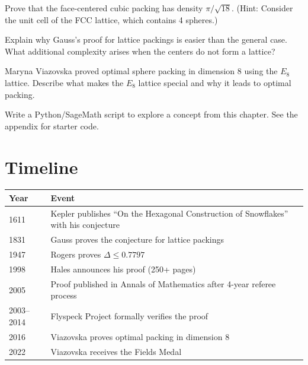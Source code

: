 \begin{exercise}[Intermediate]
Prove that the face-centered cubic packing has density $\pi/\sqrt{18}$. (Hint: Consider the unit cell of the FCC lattice, which contains 4 spheres.)
\end{exercise}

\begin{exercise}[Challenge]
Explain why Gauss's proof for lattice packings is easier than the general case. What additional complexity arises when the centers do not form a lattice?
\end{exercise}

\begin{exercise}
Maryna Viazovska proved optimal sphere packing in dimension 8 using the $E_8$ lattice. Describe what makes the $E_8$ lattice special and why it leads to optimal packing.
\end{exercise}


\begin{exercise}[Computational]
Write a Python/SageMath script to explore a concept from this chapter. See the appendix for starter code.
\end{exercise}

\section{Timeline}

\begin{tabularx}{\linewidth}{lX}
\toprule
\textbf{Year} & \textbf{Event} \\ \midrule
1611 & Kepler publishes ``On the Hexagonal Construction of Snowflakes'' with his conjecture \\ 
1831 & Gauss proves the conjecture for lattice packings \cite{gauss1831} \\ 
1947 & Rogers proves $\Delta \leq 0.7797$ \cite{rogers1947} \\ 
1998 & Hales announces his proof (250+ pages) \cite{hales2005} \\ 
2005 & Proof published in Annals of Mathematics after 4-year referee process \cite{hales2005} \\ 
2003--2014 & Flyspeck Project formally verifies the proof \cite{hales2017} \\ 
2016 & Viazovska proves optimal packing in dimension 8 \cite{viazovska2017} \\ 
2022 & Viazovska receives the Fields Medal \\ \bottomrule
\end{tabularx}

